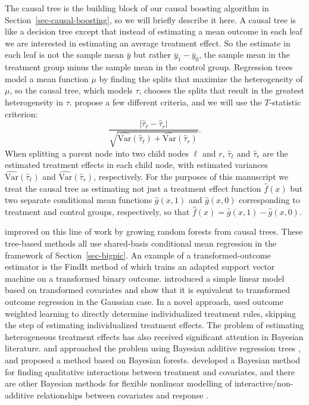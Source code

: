 \documentclass{article}
\begin{document}
The causal tree is the building block of our causal boosting
algorithm in Section~\ref{sec-causal-boosting}, so we will briefly describe it
here. A causal tree is like a decision tree except that instead of estimating
a mean outcome in each leaf we are interested in estimating an average
treatment effect. So the estimate in each leaf is not the sample mean $\bar y$
but rather $\bar y_1 - \bar y_0$, the sample mean in the treatment group minus
the sample mean in the control group. Regression trees model a mean function
$\mu$ by finding the splits that maximize the heterogeneity of $\mu$, so the
causal tree, which models $\tau$, chooses the splits that result in the
greatest heterogeneity in $\tau$.
\cite{AtheyImbens16} propose a few different criteria, and we
will use the $T$-statistic criterion:
$$\frac{|\hat\tau_\ell - \hat\tau_r|}{\sqrt{\widehat{\mbox{Var}}
  (\hat\tau_\ell)+\widehat{\mbox{Var}}(\hat\tau_r)}}.$$
When splitting a parent node into two child nodes $\ell$ and $r$,
$\hat\tau_\ell$ and $\hat\tau_r$ are the estimated treatment effects in each
child node, with estimated variances $\widehat{\mbox{Var}}(\hat\tau_\ell)$ and
$\widehat{\mbox{Var}}(\hat\tau_r)$, respectively. For the purposes of this
manuscript we treat the causal tree as estimating not just a treatment effect
function $\hat f(x)$ but two separate conditional mean functions $\hat g(x, 1)$
and $\hat g(x, 0)$ corresponding to treatment and control groups, respectively,
so that $\hat f(x) = \hat g(x, 1) - \hat g(x, 0)$.

\cite{WagerAthey15} improved on this line of work by
growing random
forests \citep{Breiman01} from causal trees. These tree-based methods all use
shared-basis conditional mean regression
in the framework of Section~\ref{sec-bigpic}. An example of a
transformed-outcome estimator is the FindIt method of
\cite{ImaiRatkovic13}
which trains an adapted support vector machine on a transformed binary outcome.
\cite{Tian-etal14} introduced a simple linear model based on
transformed covariates and show that it is equivalent to transformed outcome
regression in the
Gaussian case. In a novel approach, \cite{Zhao-etal12} used
outcome weighted
learning to directly determine individualized treatment rules, skipping the
step of estimating individualized treatment effects. The problem of estimating
heterogeneous treatment effects has also received significant attention in
Bayesian literature. \cite{Hill11} and \cite{GreenKern12}
approached the
problem using Bayesian additive regression trees \citep{Chipman-etal98}, and
\cite{Taddy-etal16} proposed a method based on Bayesian
forests. \cite{Chen-etal12} developed a Bayesian method for
finding qualitative
interactions between treatment and covariates, and there are other Bayesian
methods for flexible nonlinear modelling of interactive/non-additive
relationships between covariates and response \citep{LeBlanc95, Gustafson00}.
\end{document}
